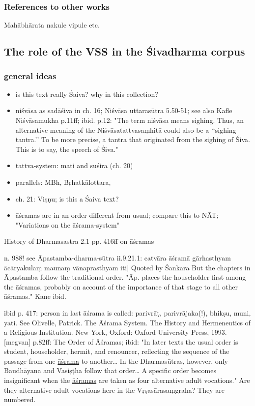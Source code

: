 \documentclass[11pt]{article}
\begin{document}
\subsubsection{References to other works}
\label{sec:org97c0b77}
Mahābhārata
nakule
vipule
etc.  
\subsection{The role of the VSS in the Śivadharma corpus}
\label{sec:orgd02f304}
\subsubsection{general ideas}
\label{sec:orgde0ae63}
\begin{itemize}
\item is this text really Śaiva? why in this collection?
\item niśvāsa as sadāśiva in ch. 16; Niśvāsa uttarasūtra 5.50-51; see also Kafle Niśvāsamukha p.11ff; ibid. p.12: "The term niśvāsa             means sighing. Thus, an alternative
meaning of the Niśvāsatattvasaṃhitā could also be a ‘‘sighing tantra.’’ To be more precise,
a tantra that originated from the sighing of Śiva. This is to say, the speech of Śiva."
\item tattva-system: mati and suśira (ch. 20)
\item parallels: MBh, Bṛhatkālottara,
\item ch. 21: Viṣṇu; is this a Śaiva text?
\item āśramas are in an order different from usual; compare this to NĀT; "Variations on the āśrama-system"
\end{itemize}

History of Dharmasastra 2.1
pp. 416ff on āśramas

n. 988! see Āpastamba-dharma-sūtra ii.9.21.1: catvāra āśramā gārhasthyam ācāryakulaṃ maunaṃ vānaprasthyam iti| Quoted by Śankara
But the chapters in Āpastamba follow the traditional order.
"Āp. places the householder first among the āśramas, probably on account of the importance of that stage to all other āśramas." Kane ibid.

ibid p. 417: person in last āśrama is called: parivrāṭ, parivrājaka(!), bhikṣu, muni, yati.
See 
Olivelle, Patrick. The Āśrama System. The History and Hermeneutics of a Religious Institution. New York, Oxford: Oxford University Press, 1993.  [megvan] p.82ff: The Order of Āśramas; 
	ibid: "In later texts the usual order is student, householder, hermit, and renouncer, reflecting the sequence of the passage from one \uline{āśrama} to another\ldots{} In the Dharmasūtras, however, only Baudhāyana and Vasiṣṭha follow that order\ldots{} A specific order becomes insignificant when the \uline{āśramas} are taken as four alternative adult vocations." 
Are they alternative adult vocations here in the Vṛṣasārasaṃgraha? They are numbered.
\end{document}
